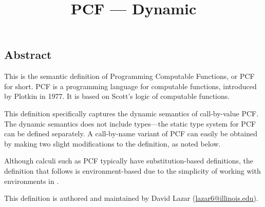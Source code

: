 \setlength{\parindent}{1em}
\title{PCF --- Dynamic}

\maketitle

\begin{latexComment}
\section*{Abstract}
This is the \K semantic definition of Programming Computable Functions, or PCF for short. PCF is a programming language for computable functions, introduced by Plotkin in 1977. It is based on Scott's logic of computable functions.

This definition specifically captures the dynamic semantics of call-by-value PCF.  The dynamic semantics does not include types---the static type system for PCF can be defined separately. A call-by-name variant of PCF can easily be obtained by making two slight modifications to the definition, as noted below.

Although calculi such as PCF typically have substitution-based definitions, the definition that follows is environment-based due to the simplicity of working with environments in \K.

This \K definition is authored and maintained by David Lazar (\href{mailto:lazar6@illinois.edu}{lazar6@illinois.edu}).
\end{latexComment}

\vspace*{3ex}
